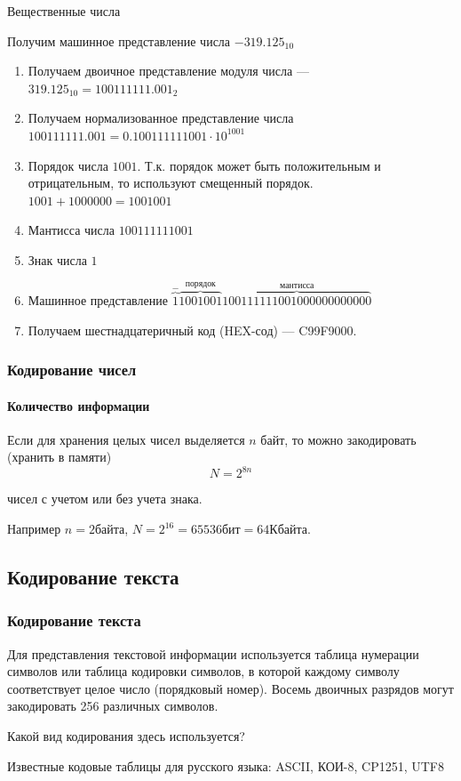 \begin{frame}{Вещественные числа}

Получим машинное представление числа $-319.125_{10}$

\begin{enumerate}
\item{Получаем двоичное представление модуля числа --- $319.125_{10}=100111111.001_2$}
\item{Получаем нормализованное представление числа $100111111.001=0.100111111001\cdot10^{1001}$}
\item{Порядок числа $1001$. Т.к. порядок может быть положительным и отрицательным, то используют смещенный порядок. 
$
1001+1000000=1001001
$
}
\item{Мантисса числа $100111111001$}
\item{Знак числа $1$}
\item{Машинное представление $\overbrace{1}^{-}\overbrace{1001001}^{порядок}\overbrace{100111111001000000000000}^{мантисса}$}
\item{Получаем шестнадцатеричный код (HEX-сод) --- C99F9000.}
\end{enumerate}

\end{frame}

\begin{frame}
\frametitle{Кодирование чисел}
\framesubtitle{Количество информации}

Если для хранения целых чисел выделяется $n$ байт, то можно закодировать (хранить в памяти) 
$$ N=2^{8n}$$

чисел с учетом или без учета знака.

Например $n=2$байта, $N=2^{16}=65536бит=64Кбайта$.

\end{frame}

 \subsection{Кодирование текста}
\begin{frame}
\frametitle{Кодирование текста}

Для представления текстовой информации используется таблица нумерации символов или таблица кодировки символов, в которой каждому символу соответствует целое число (порядковый номер). Восемь двоичных разрядов могут закодировать 256 различных символов.

\pause
Какой вид кодирования здесь используется?

\pause
Известные кодовые таблицы для русского языка: ASCII, КОИ-8, CP1251, UTF8

\end{frame}

